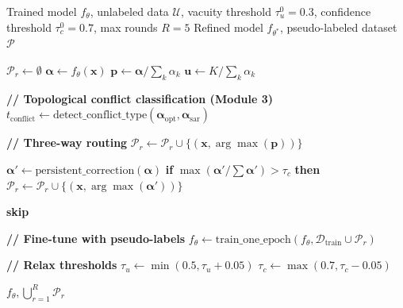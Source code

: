 \begin{algorithm}[h]
\caption{Topological Self-Training Loop}
\label{alg:self-training}
\begin{algorithmic}[1]
\Require Trained model $f_\theta$, unlabeled data $\mathcal{U}$,
         vacuity threshold $\tau_u^0 = 0.3$, confidence threshold $\tau_c^0 = 0.7$,
         max rounds $R = 5$
\Ensure Refined model $f_{\theta^*}$, pseudo-labeled dataset $\mathcal{P}$

    \State $\mathcal{P}_r \gets \emptyset$
        \State $\boldsymbol{\alpha} \gets f_\theta(\mathbf{x})$
        \State $\mathbf{p} \gets \boldsymbol{\alpha} / \sum_k \alpha_k$
        \State $\mathbf{u} \gets K / \sum_k \alpha_k$

        \State \textbf{// Topological conflict classification (Module 3)}
        \State $t_{\text{conflict}} \gets \text{detect\_conflict\_type}(
            \boldsymbol{\alpha}_{\text{opt}}, \boldsymbol{\alpha}_{\text{sar}})$

        \State \textbf{// Three-way routing}
            \State $\mathcal{P}_r \gets \mathcal{P}_r \cup \{(\mathbf{x},
                \arg\max(\mathbf{p}))\}$

            \State $\boldsymbol{\alpha}' \gets \text{persistent\_correction}(
                \boldsymbol{\alpha})$
            \State \textbf{if} $\max(\boldsymbol{\alpha}' / \sum \boldsymbol{\alpha}') > \tau_c$
                \textbf{then}
                $\mathcal{P}_r \gets \mathcal{P}_r \cup \{(\mathbf{x},
                    \arg\max(\boldsymbol{\alpha}'))\}$

        \Else
            \State \textbf{skip}
        \EndIf
    \EndFor

    \State \textbf{// Fine-tune with pseudo-labels}
    \State $f_\theta \gets \text{train\_one\_epoch}(f_\theta,
        \mathcal{D}_{\text{train}} \cup \mathcal{P}_r)$

    \State \textbf{// Relax thresholds}
    \State $\tau_u \gets \min(0.5, \tau_u + 0.05)$
    \State $\tau_c \gets \max(0.7, \tau_c - 0.05)$
\EndFor

\State \Return $f_\theta, \bigcup_{r=1}^R \mathcal{P}_r$
\end{algorithmic}
\end{algorithm}


